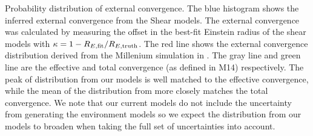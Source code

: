 Probability distribution of external convergence. The blue histogram shows the inferred external convergence from the Shear models. The external convergence was calculated by measuring the offset in the best-fit Einstein radius of the shear models with $\kappa = 1 - R_{E, \rm{fit}} / R_{E,\rm{truth}}$. The red line shows the external convergence distribution derived from the Millenium simulation in \citet{Suyu13}. The gray line and green line are the effective and total convergence (as defined in M14) respectively. The peak of distribution from our models is well matched to the effective convergence, while the mean of the distribution from \citet{Suyu13} more closely matches the total convergence. We note that our current models do not include the uncertainty from generating the environment models so we expect the distribution from our models to broaden when taking the full set of uncertainties into account.